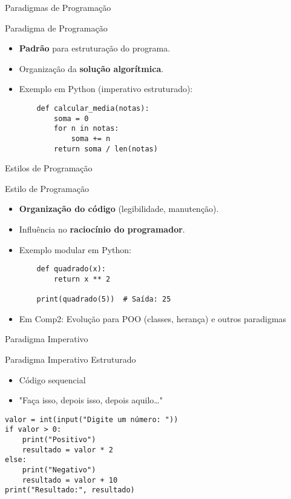 \begin{frame}[fragile]{Paradigmas de Programação}


\begin{block}{Paradigma de Programação}
\begin{itemize}
    \item \textbf{Padrão} para estruturação do programa.
    \item Organização da \textbf{solução algorítmica}.
    \item Exemplo em Python (imperativo estruturado):
    \begin{verbatim}
    def calcular_media(notas):
        soma = 0
        for n in notas:
            soma += n
        return soma / len(notas)
    \end{verbatim}
\end{itemize}
\end{block}
\end{frame}
\begin{frame}[fragile]{Estilos de Programação}
\begin{block}{Estilo de Programação}
\begin{itemize}
    \item \textbf{Organização do código} (legibilidade, manutenção).
    \item Influência no \textbf{raciocínio do programador}.
    \item Exemplo modular em Python:
    \begin{verbatim}
    def quadrado(x):
        return x ** 2

    print(quadrado(5))  # Saída: 25
    \end{verbatim}
\end{itemize}
\end{block}

\centering
\begin{itemize}
    \item Em Comp2: Evolução para POO (classes, herança) e outros paradigmas
 
\end{itemize}
\end{frame}



\begin{frame}[fragile]{Paradigma Imperativo}

\begin{block}{Paradigma Imperativo Estruturado}
\begin{itemize}
    \item Código sequencial
    \item "Faça isso, depois isso, depois aquilo…"
\end{itemize}
\begin{verbatim}
valor = int(input("Digite um número: "))
if valor > 0:
    print("Positivo")
    resultado = valor * 2
else:
    print("Negativo")
    resultado = valor + 10
print("Resultado:", resultado)
\end{verbatim}
\vspace{-0.3cm}

\end{block}
\end{frame}

